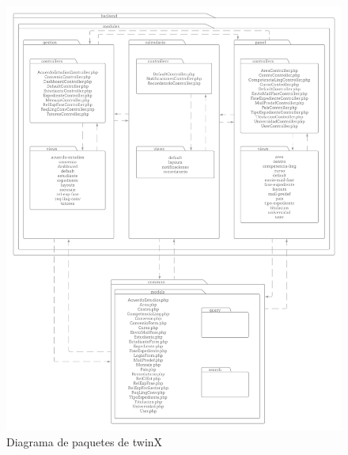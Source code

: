 \begin{figure}
	\centering
	\includegraphics[width=\linewidth]{img/diagrama_paquetes}
	\caption{Diagrama de paquetes de twinX}
	\label{fig:diagramapaquetes}
\end{figure}